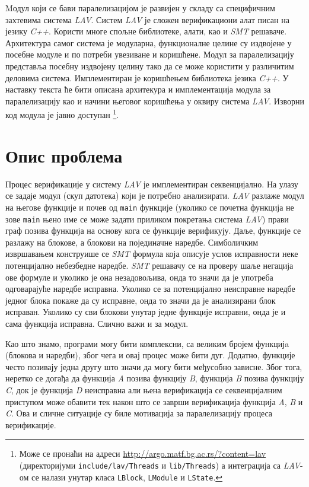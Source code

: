 \documentclass[12pt,oneside]{memoir}
\begin{document}
Mодул који се бави паралелизацијом је развијен у складу са специфичним захтевима система \textit{LAV}. Систем \textit{LAV} је сложен верификациони алат писан на језику \textit{C++}. Користи многе спољне библиотеке, алати, као и \textit{SMT} решаваче.  Архитектура самог система је модуларна, функционалне целине су издвојене у посебне модуле и по потреби увезиване и коришћене. Модул за паралелизацију представља посебну издвојену целину тако да се може користити у различитим деловима система. Имплементиран је коришћењем библиотека језика \textit{C++}. У наставку текста ће бити описана архитекура и имплементација модула за паралелизацију као и начини његовог коришћења у оквиру система \textit{LAV}. Изворни код модула је јавно доступан \footnote{Може се пронаћи на адреси \url{http://argo.matf.bg.ac.rs/?content=lav} (директоријуми \texttt{include/lav/Threads} и \texttt{lib/Threads}) а интеграција са \textit{LAV}-ом се налази унутар класа \texttt{LBlock}, \texttt{LModule} и \texttt{LState}.}.  

\section{Опис проблема}
Процес верификације у систему \textit{LAV} је имплементиран секвенцијално. На улазу се задаје модул (скуп датотека) који је потребно анализирати.  \textit{LAV} разлаже модул на његове функције и почев од \texttt{main} функције (уколико се почетна функција не зове \texttt{main} њено име се може задати приликом покретања система \textit{LAV}) прави граф позива функција  на основу кога се функције верификују. Даље, функције се разлажу на блокове, а блокови на појединачне наредбе. Симболичким извршавањем конструише се \textit{SMT} формула која описује услов исправности неке потенцијално небезбедне наредбе. \textit{SMT} решавачу се на проверу шаље негација ове формуле и уколико је она незадовољива, онда то значи да је употреба одговарајуће наредбе исправна. Уколико се за потенцијално неисправне наредбе једног блока покаже да су исправне, онда то значи да је анализирани блок исправан. Уколико су сви блокови унутар једне функције исправни, онда је и сама функција исправна. Слично важи и за модул. 

Као што знамо, програми могу бити комплексни, са великим бројем функцијa (блокова и наредби), због чега и овај процес може бити дуг. Додатно, функције често позивају једна другу што значи да могу бити међусобно зависне. Због тога, неретко се догађа да функција \textit{A} позива функцију \textit{B}, функција \textit{B} позива функцију \textit{C}, док је функција \textit{D} неисправна али њена верификација се секвенцијалним приступом може обавити тек након што се заврши верификација функција \textit{A}, \textit{B} и \textit{C}. Ова и сличне ситуације су биле мотивација за паралелизацију процеса верификације. 
\end{document}
